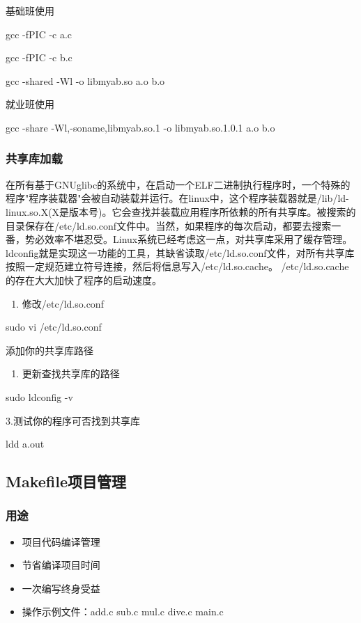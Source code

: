 \documentclass[11pt]{article}
\begin{document}
基础班使用

gcc -fPIC -c a.c

gcc -fPIC -c b.c

gcc -shared -Wl -o libmyab.so a.o b.o 

就业班使用

gcc -share -Wl,-soname,libmyab.so.1 -o libmyab.so.1.0.1 a.o b.o 
\subsubsection{共享库加载}
\label{sec-1-5-3}
在所有基于GNUglibc的系统中，在启动一个ELF二进制执行程序时，一个特殊的程序"程序装载器"会被自动装载并运行。在linux中，这个程序装载器就是/lib/ld-linux.so.X(X是版本号)。它会查找并装载应用程序所依赖的所有共享库。被搜索的目录保存在/etc/ld.so.conf文件中。当然，如果程序的每次启动，都要去搜索一番，势必效率不堪忍受。Linux系统已经考虑这一点，对共享库采用了缓存管理。ldconfig就是实现这一功能的工具，其缺省读取/etc/ld.so.conf文件，对所有共享库按照一定规范建立符号连接，然后将信息写入/etc/ld.so.cache。 /etc/ld.so.cache的存在大大加快了程序的启动速度。 

\begin{enumerate}
\item 修改/etc/ld.so.conf
\end{enumerate}

sudo vi /etc/ld.so.conf

添加你的共享库路径

\begin{enumerate}
\item 更新查找共享库的路径
\end{enumerate}

sudo ldconfig -v

3.测试你的程序可否找到共享库

ldd a.out

\subsection{Makefile项目管理}
\label{sec-1-6}
\subsubsection{用途}
\label{sec-1-6-1}
\begin{itemize}
\item 项目代码编译管理
\item 节省编译项目时间
\item 一次编写终身受益
\item 操作示例文件：add.c sub.c mul.c dive.c main.c
\end{itemize}
\end{document}
